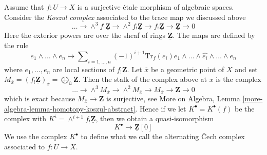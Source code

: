 \medskip\noindent
Assume that $f : U \to X$ is a surjective \'etale
morphism of algebraic spaces. Consider the {\it Koszul complex}
associated to the trace map we discussed above
$$
\ldots \to \wedge^3f_!\underline{\mathbf{Z}} \to
\wedge^2f_!\underline{\mathbf{Z}} \to f_!\underline{\mathbf{Z}} \to
\underline{\mathbf{Z}} \to 0
$$
Here the exterior powers are over the sheaf of rings $\underline{\mathbf{Z}}$.
The maps are defined by the rule
$$
e_1 \wedge \ldots \wedge e_n \longmapsto
\sum\nolimits_{i = 1, \ldots, n} (-1)^{i + 1}
\text{Tr}_f(e_i)
e_1 \wedge \ldots \wedge \widehat{e_i} \wedge \ldots \wedge e_n
$$
where $e_1, \ldots, e_n$ are local sections of $f_!\underline{\mathbf{Z}}$.
Let $\overline{x}$ be a geometric point of $X$ and set
$M_{\overline{x}} = (f_!\underline{\mathbf{Z}})_{\overline{x}} =
\bigoplus_{\overline{u}} \mathbf{Z}$. Then the stalk of the complex above at
$\overline{x}$ is the complex
$$
\ldots \to \wedge^3 M_{\overline{x}} \to \wedge^2 M_{\overline{x}}
\to M_{\overline{x}} \to \mathbf{Z} \to 0
$$
which is exact because $M_{\overline{x}} \to \mathbf{Z}$ is surjective, see
More on Algebra, Lemma \ref{more-algebra-lemma-homotopy-koszul-abstract}.
Hence if we let $K^\bullet = K^\bullet(f)$ be the complex with
$K^i = \wedge^{i + 1}f_!\underline{\mathbf{Z}}$, then we obtain a
quasi-isomorphism
\begin{equation}
\label{equation-quasi-isomorphism}
K^\bullet \longrightarrow \underline{\mathbf{Z}}[0]
\end{equation}
We use the complex $K^\bullet$ to define what we call
the alternating {\v C}ech complex associated to $f : U \to X$.

